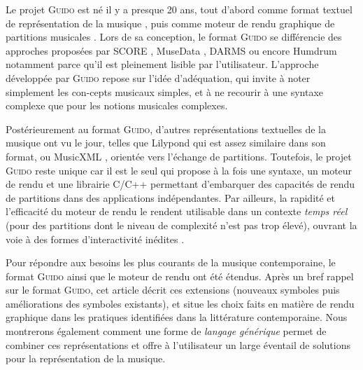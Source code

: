 \documentclass{article}
\newcommand{\guido}			{\textsc{Guido}}
\begin{document}
Le projet \guido{} est né il y a presque 20 ans, tout d'abord comme format textuel de représentation de la musique \cite{hoos98,guido}, puis comme moteur de rendu graphique de partitions musicales \cite{RENZ02}. 
Lors de sa conception, le format \guido{} se différencie des approches proposées par SCORE \cite{SCORE}, MuseData \cite{Hewlett97}, DARMS \cite{darms} ou encore Humdrum \cite{Huron97} notamment parce qu'il est pleinement lisible par l'utilisateur. L'approche développée par \guido{} repose sur l'idée d'adéquation, qui invite à noter simplement les con-cepts musicaux simples, et à ne recourir à une syntaxe complexe que pour les notions musicales complexes.

Postérieurement au format \guido{}, d'autres représentations textuelles de la musique ont vu le jour, telles que Lilypond \cite{lilypond03,lilypond06} qui est assez similaire dans son format, ou MusicXML \cite{good01}, orientée vers l'échange de partitions. Toutefois, le projet \guido{} reste unique car il est le seul qui propose à la fois une syntaxe, un moteur de rendu et une librairie C/C++ permettant d'embarquer des capacités de rendu de partitions dans des applications indépendantes.
Par ailleurs, la rapidité et l'efficacité du moteur de rendu le rendent utilisable dans un contexte \textit{temps réel} (pour des partitions dont le niveau de complexité n'est pas trop élevé), ouvrant la voie à des formes d'interactivité inédites \cite{Hoadley12,Fober:12a}.

Pour répondre aux besoins les plus courants de la musique contemporaine, le format \guido{} ainsi que le moteur de rendu ont été étendus. Après un bref rappel sur le format \guido{}, cet article décrit ces extensions (nouveaux symboles puis améliorations des symboles existants), et situe les choix faits en matière de rendu graphique dans les pratiques identifiées dans la littérature contemporaine. Nous montrerons également comment une forme de \emph{langage générique} permet de combiner ces représentations et offre à l'utilisateur un large éventail de solutions pour la représentation de la musique.


\end{document}
